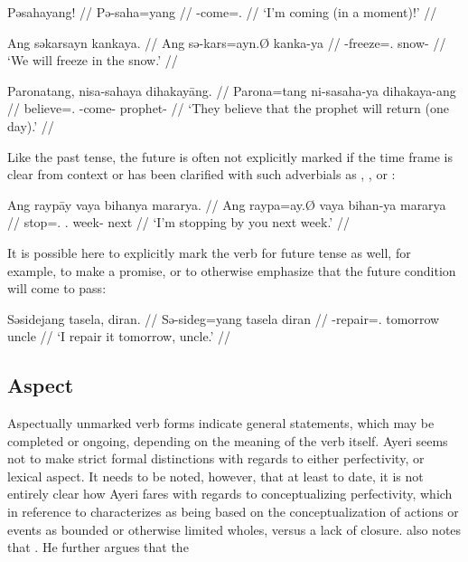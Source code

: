 \pex
\a\label{ex:nfut}\begingl
	\gla Pəsahayang! //
	\glb Pə-saha=yang //
	\glc \NFut{}-come=\Fsg{}.\Aarg{} //
	\glft `I'm coming (in a moment)!' //
\endgl

\a\label{ex:fut}\begingl
	\gla Ang səkarsayn kankaya. //
	\glb Ang sə-kars=ayn.Ø kanka-ya //
	\glc \AgtT{} \Fut{}-freeze=\Fsg{}.\Top{} snow-\Loc{} //
	\glft `We will freeze in the snow.' //
\endgl

\a\label{ex:rfut}\begingl
	\gla Paronatang, nisa-sahaya dihakayāng. //
	\glb Parona=tang ni-sa\til{}saha-ya dihakaya-ang //
	\glc believe=\TplM{}.\Aarg{} \RFut{}-\Iter{}\til{}come-\TsgM{} 
		prophet-\Aarg{} //
	\glft `They believe that the prophet will return (one day).' //
\endgl

\xe

Like the past tense, the future is often not explicitly marked if the time 
frame is clear from context or has been clarified with such adverbials as 
, , or :

\ex\begingl
	\gla Ang raypāy vaya bihanya mararya. //
	\glb Ang raypa=ay.Ø vaya bihan-ya mararya //
	\glc \AgtT{} stop=\Fsg{}.\Top{} \Ssg{}.\Loc{} week-\Loc{} next //
	\glft `I'm stopping by you next week.' //
\endgl\xe

It is possible here to explicitly mark the verb for future tense as well, for 
example, to make a promise, or to otherwise emphasize that the future condition 
will come to pass:

\ex\begingl
	\gla Səsidejang tasela, diran. //
	\glb Sə-sideg=yang tasela diran //
	\glc \Fut{}-repair=\Fsg{}.\Aarg{} tomorrow uncle //
	\glft `I  repair it tomorrow, uncle.' //
\endgl\xe



\subsection{Aspect}

Aspectually unmarked verb forms indicate general statements, which may be 
completed or ongoing, depending on the meaning of the verb itself. Ayeri 
seems not to make strict formal distinctions with regards to either 
perfectivity, or lexical aspect. It needs to be noted, however, that at least 
to date, it is not entirely clear how Ayeri fares with regards to 
conceptualizing perfectivity, which \citet[76]{dahl1985} in reference to 
\citet[16]{comrie1976} characterizes as being based on the conceptualization of 
actions or events as bounded or otherwise limited wholes, versus a lack of 
closure. \citeauthor{dahl1985} also notes that . He further argues that the 

